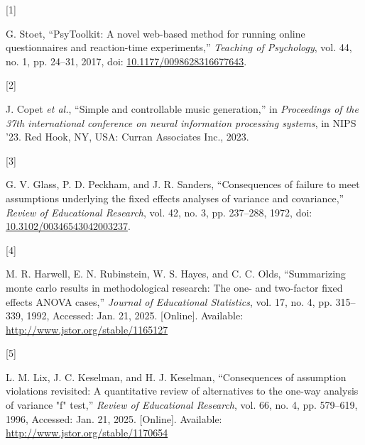 \documentclass[
  letterpaper,
  DIV=11,
  numbers=noendperiod]{scrartcl}
\newlength{\cslhangindent}
\newlength{\csllabelwidth}
\newenvironment{CSLReferences}[2] %
 {\begin{list}{}{%
  \setlength{\itemindent}{0pt}
  \setlength{\leftmargin}{0pt}
  \setlength{\parsep}{0pt}
  \ifodd #1
   \setlength{\leftmargin}{\cslhangindent}
   \setlength{\itemindent}{-1\cslhangindent}
  \fi
  \setlength{\itemsep}{#2\baselineskip}}}
 {\end{list}}
\newcommand{\CSLLeftMargin}[1]{\parbox[t]{\csllabelwidth}{\strut#1\strut}}
\newcommand{\CSLRightInline}[1]{\parbox[t]{\linewidth - \csllabelwidth}{\strut#1\strut}}
\begin{document}
\label{refs}
\begin{CSLReferences}{0}{0}
\CSLLeftMargin{{[}1{]} }%
\CSLRightInline{G. Stoet, {``PsyToolkit: A novel web-based method for
running online questionnaires and reaction-time experiments,''}
\emph{Teaching of Psychology}, vol. 44, no. 1, pp. 24--31, 2017, doi:
\href{https://doi.org/10.1177/0098628316677643}{10.1177/0098628316677643}.}

\CSLLeftMargin{{[}2{]} }%
\CSLRightInline{J. Copet \emph{et al.}, {``Simple and controllable music
generation,''} in \emph{Proceedings of the 37th international conference
on neural information processing systems}, in NIPS '23. Red Hook, NY,
USA: Curran Associates Inc., 2023.}

\CSLLeftMargin{{[}3{]} }%
\CSLRightInline{G. V. Glass, P. D. Peckham, and J. R. Sanders,
{``Consequences of failure to meet assumptions underlying the fixed
effects analyses of variance and covariance,''} \emph{Review of
Educational Research}, vol. 42, no. 3, pp. 237--288, 1972, doi:
\href{https://doi.org/10.3102/00346543042003237}{10.3102/00346543042003237}.}

\CSLLeftMargin{{[}4{]} }%
\CSLRightInline{M. R. Harwell, E. N. Rubinstein, W. S. Hayes, and C. C.
Olds, {``Summarizing monte carlo results in methodological research: The
one- and two-factor fixed effects ANOVA cases,''} \emph{Journal of
Educational Statistics}, vol. 17, no. 4, pp. 315--339, 1992, Accessed:
Jan. 21, 2025. {[}Online{]}. Available:
\url{http://www.jstor.org/stable/1165127}}

\CSLLeftMargin{{[}5{]} }%
\CSLRightInline{L. M. Lix, J. C. Keselman, and H. J. Keselman,
{``Consequences of assumption violations revisited: A quantitative
review of alternatives to the one-way analysis of variance "f" test,''}
\emph{Review of Educational Research}, vol. 66, no. 4, pp. 579--619,
1996, Accessed: Jan. 21, 2025. {[}Online{]}. Available:
\url{http://www.jstor.org/stable/1170654}}

\end{CSLReferences}
\end{document}
